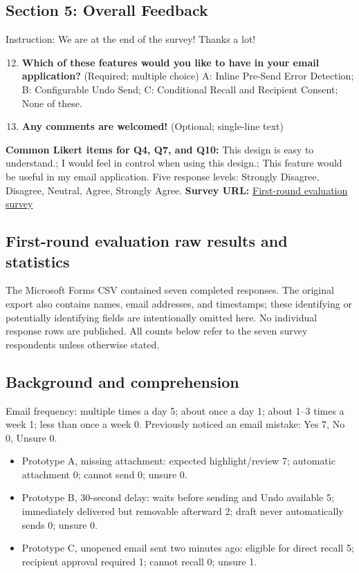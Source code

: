 \documentclass[letterpaper]{jdf}
\begin{document}
\subsection*{Section 5: Overall Feedback}
Instruction: We are at the end of the survey! Thanks a lot!
\begin{enumerate}\setcounter{enumi}{11}
\item \textbf{Which of these features would you like to have in your email application?} (Required; multiple choice) A: Inline Pre-Send Error Detection; B: Configurable Undo Send; C: Conditional Recall and Recipient Consent; None of these.
\item \textbf{Any comments are welcomed!} (Optional; single-line text)
\end{enumerate}
\textbf{Common Likert items for Q4, Q7, and Q10:} This design is easy to understand.; I would feel in control when using this design.; This feature would be useful in my email application. Five response levels: Strongly Disagree, Disagree, Neutral, Agree, Strongly Agree.
\textbf{Survey URL:} \href{https://forms.cloud.microsoft/Pages/ResponsePage.aspx?id=u5ghSHuuJUuLem1_Mvqgg7vYf6y_H89LjQflMz5FAJxUREs2T01PWVBWMUZXS1FSSFNBNEI2Uk5KOS4u}{First-round evaluation survey}

\subsection{First-round evaluation raw results and statistics}\label{app:first-evaluation-results}
The Microsoft Forms CSV contained seven completed responses. The original export also contains names, email addresses, and timestamps; these identifying or potentially identifying fields are intentionally omitted here. No individual response rows are published. All counts below refer to the seven survey respondents unless otherwise stated.
\subsection*{Background and comprehension}
Email frequency: multiple times a day 5; about once a day 1; about 1--3 times a week 1; less than once a week 0. Previously noticed an email mistake: Yes 7, No 0, Unsure 0.
\begin{itemize}
\item Prototype A, missing attachment: expected highlight/review 7; automatic attachment 0; cannot send 0; unsure 0.
\item Prototype B, 30-second delay: waits before sending and Undo available 5; immediately delivered but removable afterward 2; draft never automatically sends 0; unsure 0.
\item Prototype C, unopened email sent two minutes ago: eligible for direct recall 5; recipient approval required 1; cannot recall 0; unsure 1.
\end{itemize}
\end{document}
